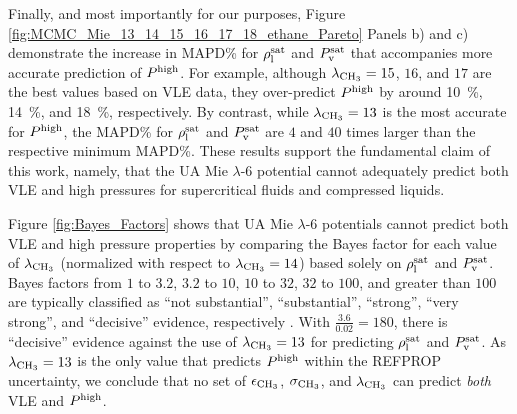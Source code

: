 \documentclass[preprint,letterpaper,floatfix,citeautoscript,aip,jcp]{revtex4-1}
\begin{document}
Finally, and most importantly for our purposes, Figure \ref{fig:MCMC_Mie_13_14_15_16_17_18_ethane_Pareto} Panels b) and c) demonstrate the 
increase in MAPD\% for $\rho_{\rm l}^{\rm sat}$ and $P_{\rm v}^{\rm sat}$ that accompanies more accurate prediction of $P^{\rm high}$. For example, although $\lambda_{\rm CH_3} = 15$, $16$, and $17$ are the best values based on VLE data, they over-predict $P^{\rm high}$ by around 10~\%, 14~\%, and 18~\%, respectively. By contrast, while $\lambda_{\rm CH_3} = 13$ is the most accurate for $P^{\rm high}$, the MAPD\% for $\rho_{\rm l}^{\rm sat}$ and $P_{\rm v}^{\rm sat}$ are $4$ and $40$ times larger than the respective minimum MAPD\%. These results support the fundamental claim of this work, namely, that the UA Mie $\lambda$-6 potential cannot adequately predict both VLE and high pressures for supercritical fluids and compressed liquids. 

Figure \ref{fig:Bayes_Factors} shows that UA Mie $\lambda$-6 potentials cannot predict both VLE and high pressure properties by comparing the Bayes factor for each value of $\lambda_{\rm CH_3}$ (normalized with respect to $\lambda_{\rm CH_3} = 14$) based solely on $\rho_{\rm l}^{\rm sat}$ and $P_{\rm v}^{\rm sat}$. Bayes factors from $1$ to $3.2$, $3.2$ to $10$, $10$ to $32$, $32$ to $100$, and greater than $100$ are typically classified as ``not substantial'', ``substantial'', ``strong'', ``very strong'', and ``decisive'' evidence, respectively \cite{Jeffreys2004}. With $\frac{3.6}{0.02} = 180$, there is ``decisive'' evidence against the use of $\lambda_{\rm CH_3} = 13$ for predicting $\rho_{\rm l}^{\rm sat}$ and $P_{\rm v}^{\rm sat}$. As $\lambda_{\rm CH_3} = 13$ is the only value that predicts $P^{\rm high}$ within the REFPROP uncertainty, we conclude that no set of $\epsilon_{\rm CH_3}$, $\sigma_{\rm CH_3}$, and $\lambda_{\rm CH_3}$ can predict \textit{both} VLE and $P^{\rm high}$. 


%
%
\end{document}

